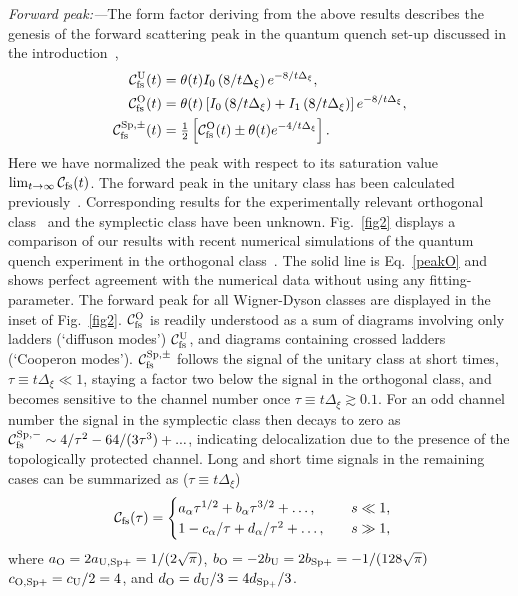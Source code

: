 \documentclass[twocolumn,showpacs,aps,prl]{revtex4}
\begin{document}
{\it Forward peak:---}The form factor deriving from the above results 
describes the
genesis of the forward scattering peak in the quantum quench set-up  
discussed in the introduction~\cite{SuppMat,fn6},  
\begin{align}
\label{peakU}
{\cal C}^{\rm U}_{\rm fs}(t)
&=
\theta(t)
I_0\left( 8/t \Delta_\xi  \right)
e^{-8/t \Delta_\xi },
\\
\label{peakO}
{\cal C}^{\rm O}_{\rm fs}(t)
&=
\theta(t)
\left[ 
I_0\left( 8/t\Delta_\xi  \right)
+
I_1\left( 8/t\Delta_\xi  \right)
\right]
e^{-8/t\Delta_\xi },
\\
\label{peakSp}
{\cal C}^{\rm Sp,\pm}_{\rm fs}(t)
&=
\tfrac{1}{2}
\left[
{\cal C}^{\rm O}_{\rm fs}(t)
\pm
\theta(t)
e^{-4/t\Delta_\xi }
\right].
\end{align}
Here we have normalized the peak with respect to its saturation value 
$\lim_{t\to\infty}{\cal C}_{\rm fs}(t)$. 
The forward peak in the unitary class has been calculated previously~\cite{fwd4,fn7}. 
Corresponding results for the experimentally relevant orthogonal class~\cite{Josse} 
and the symplectic class have been unknown. 
Fig.~\ref{fig2} displays a comparison of our results with recent numerical simulations of the 
quantum quench experiment in the orthogonal class~\cite{fn7}.
The solid line is Eq.~\eqref{peakO} 
and shows perfect agreement with the numerical data  without using any fitting-parameter. 
The forward peak for all Wigner-Dyson classes are displayed in the inset of Fig.~\ref{fig2}. 
${\cal C}^{\rm O}_{\rm fs}$ is readily understood as 
a sum of diagrams involving only ladders (`diffuson modes') 
 ${\cal C}^{\rm U}_{\rm fs}$, 
and diagrams containing crossed ladders (`Cooperon modes').
${\cal C}^{\rm Sp,\pm}_{\rm fs}$ follows the signal 
of the unitary class
at short times, $\tau\equiv t \Delta_\xi \ll 1$, staying a factor two below the signal in the orthogonal class, 
and becomes sensitive to the channel number once $\tau\equiv t \Delta_\xi \gtrsim 0.1$. 
For an odd channel number the signal in the symplectic class then 
 decays to zero as 
${\cal C}^{\rm Sp,-}_{\rm fs}\sim
4/\tau^2- 64/(3\tau^3)+...$, 
indicating delocalization due to the presence of the topologically protected channel.
Long and short time signals in the remaining cases 
can be summarized as 
 ($\tau\equiv t \Delta_\xi $)
\begin{align}
{\cal C}_{\rm fs}(\tau)
&=
\begin{cases}
a_\alpha \tau^{1/2}
+b_\alpha \tau^{3/2}+\dots, 	
\quad 
& s \ll 1, 
\\
1 - c_\alpha/\tau + d_\alpha/\tau^2
+\dots, 
\quad  
&  s\gg 1, 
\end{cases}
\end{align}
where 
$a_{\rm O}=2a_{\rm U, Sp+}=1/(2\sqrt{\pi})$, 
$b_{\rm O}=-2b_{\rm U}=2b_{\rm Sp+}=-1/(128\sqrt{\pi})$
$c_{\rm O,Sp+}=c_{\rm U}/2=4$, 
and $d_{\rm O}=d_{\rm U}/3=4d_{\rm Sp_+}/3$.
\end{document}
